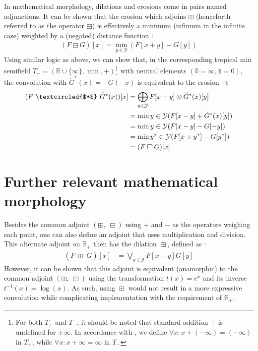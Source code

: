 \documentclass[a4paper, 12pt]{report}
\begin{document}
In mathematical morphology, dilations and erosions come in pairs named adjunctions. It can be shown that the erosion which adjoins $\boxplus$ (henceforth referred to as the operator $\boxminus$) is effectively a minimum (infimum in the infinite case) weighted by a (negated) distance function \cite{heijmans1996morphological}: 
\begin{align}
	(F \boxminus G)[x]=\min_{y\in \mathcal{Y}}(F[x+y] - G[y])
\end{align}
\noindent
Using similar logic as above, we can show that, in the corresponding tropical min semifield $T_-=(\mathbb{R}\cup\{\infty\},\min,+)$\footnote{For both $T_+$ and $T_-$, it should be noted that standard addition $+$ is undefined for $\pm\infty$. In accordance with \cite{maragos}, we define $\forall x: x+(-\infty)=(-\infty)$ in $T_+$, while $\forall x: x+\infty=\infty$ in $T_-$} \cite{maragos} with neutral elements $(\mathbb{0}=\infty, \mathbb{1}=0)$, the convolution with $\check{G}^*(x)=-G(-x)$ is equivalent to the erosion $\boxminus$:
\begin{align}
	(F ~\textcircled{$*$}~ \check{G}^*(x))[x]
	&= \bigoplus_{y\in \mathcal{Y}}F[x-y] \otimes \check{G}^*(x)[y] \\
	&= \min{y\in \mathcal{Y}}(F[x-y] + \check{G}^*(x)[y]) \\
	&= \min{y\in \mathcal{Y}}(F[x-y] - G[-y]) \\
	&= \min{y^*\in \mathcal{Y}}(F[x+y^*] - G[y^*]) \\
	&= (F \boxminus G)[x]
\end{align}

\section{Further relevant mathematical morphology}
Besides the common adjoint $(\boxplus,\; \boxminus)$ using $+$ and $-$ as the operators weighing each point, one can also define an adjoint that uses multiplication and division. This alternate adjoint on $\mathbb{R}_+$ then has the dilation $\dot \boxplus$, defined as \cite{heijmans1996morphological}:
\begin{align}
	(F~ \dot\boxplus~ G)[x] &= \bigvee_{y\in \mathcal{Y}}F[x-y]G[y]
\end{align}
However, it can be shown that this adjoint is equivalent (anamorphic) to the common adjoint $(\boxplus,\; \boxminus)$ using the transformation $t(x)=e^x$ and its inverse $t^{-1}(x)=\log(x)$. As such, using $\dot \boxplus$ would not result in a more expressive convolution while complicating implementation with the requirement of $\mathbb{R}_+$.
\end{document}
